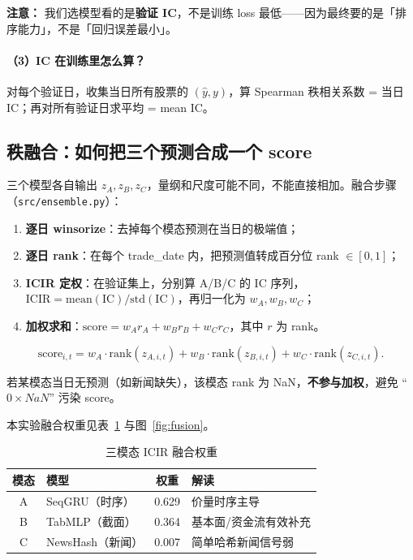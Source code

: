 \documentclass[UTF8,a4paper,12pt]{ctexart}
\begin{document}
\textbf{注意：} 我们选模型看的是\textbf{验证 IC}，不是训练 loss 最低——因为最终要的是「排序能力」，不是「回归误差最小」。

\paragraph{（3）IC 在训练里怎么算？}

对每个验证日，收集当日所有股票的 $(\hat{y}, y)$，算 Spearman 秩相关系数 = 当日 IC；再对所有验证日求平均 = mean IC。

\subsection{秩融合：如何把三个预测合成一个 score}

三个模型各自输出 $z_A, z_B, z_C$，量纲和尺度可能不同，不能直接相加。融合步骤（\texttt{src/ensemble.py}）：

\begin{enumerate}[leftmargin=2em]
  \item \textbf{逐日 winsorize}：去掉每个模态预测在当日的极端值；
  \item \textbf{逐日 rank}：在每个 trade\_date 内，把预测值转成百分位 rank $\in [0,1]$；
  \item \textbf{ICIR 定权}：在验证集上，分别算 A/B/C 的 IC 序列，$\mathrm{ICIR}=\mathrm{mean(IC)}/\mathrm{std(IC)}$，再归一化为 $w_A,w_B,w_C$；
  \item \textbf{加权求和}：$\mathrm{score} = w_A r_A + w_B r_B + w_C r_C$，其中 $r$ 为 rank。
\end{enumerate}

\begin{equation}
  \mathrm{score}_{i,t} = w_A \cdot \mathrm{rank}(z_{A,i,t}) + w_B \cdot \mathrm{rank}(z_{B,i,t}) + w_C \cdot \mathrm{rank}(z_{C,i,t}).
\end{equation}

若某模态当日无预测（如新闻缺失），该模态 rank 为 NaN，\textbf{不参与加权}，避免 ``$0\times NaN$'' 污染 score。

本实验融合权重见表~\ref{tab:weights} 与图~\ref{fig:fusion}。

\begin{table}[H]
\centering
\caption{三模态 ICIR 融合权重}
\label{tab:weights}
\begin{tabular}{clcl}
\toprule
\textbf{模态} & \textbf{模型} & \textbf{权重} & \textbf{解读} \\
\midrule
A & SeqGRU（时序）   & 0.629 & 价量时序主导 \\
B & TabMLP（截面）   & 0.364 & 基本面/资金流有效补充 \\
C & NewsHash（新闻） & 0.007 & 简单哈希新闻信号弱 \\
\bottomrule
\end{tabular}
\end{table}
\end{document}
